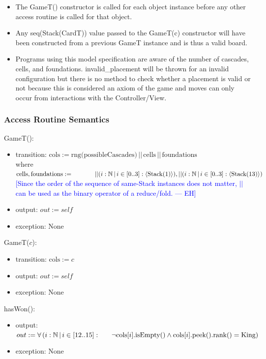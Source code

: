\documentclass[12pt]{article}
\newcommand{\ind}{\hspace*{0.6cm}}
\newcommand{\rem}[1]{\textcolor{blue}{[#1 --- EH]}}
\begin{document}
\begin{itemize}
    \item The GameT() constructor is called for each object instance before
        any other access routine is called for that object.
    \item Any seq(Stack(CardT)) value passed to the GameT(c) constructor will
        have been constructed from a previous GameT instance and is thus a valid
        board.
    \item Programs using this model specification are aware of the number of
        cascades, cells, and foundations. invalid\_placement will be thrown for
        an invalid configuration but there is no method to check whether a
        placement is valid or not because this is considered an axiom of the
        game and moves can only occur from interactions with the
        Controller/View.
\end{itemize}

\subsubsection*{Access Routine Semantics}

GameT():
\begin{itemize}
    \item transition: $
        \mbox{cols} := \mbox{rng(possibleCascades)} \,||\, \mbox{cells} \,||\, \mbox{foundations}$\\
        \ind where $\mbox{cells}, \mbox{foundations} :=
        \\\ind\ind ||( i : \mathbb{N} \,|\, i \in [0..3] : \left< \mbox{Stack}(1) \right> ),
        ||( i : \mathbb{N} \,|\, i \in [0..3] : \left< \mbox{Stack}(13) \right> )
        $
        \rem{Since the order of the sequence of same-Stack instances does not
        matter, $||$ can be used as the binary operator of a reduce/fold.}
    \item output: $out := self$
    \item exception: None
\end{itemize}

\noindent GameT($c$):
\begin{itemize}
    \item transition: $\mbox{cols} := c$
    \item output: $out := self$
    \item exception: None
\end{itemize}

\noindent hasWon():
\begin{itemize}
    \item output: $out := \forall\,( i : \mathbb{N} \,|\, i \in [12..15] :
        \\\ind \lnot \mbox{cols}[i].\mbox{isEmpty}() \land \mbox{cols}[i].\mbox{peek}().\mbox{rank}() = \mbox{King})$
    \item exception: None
\end{itemize}
\end{document}
